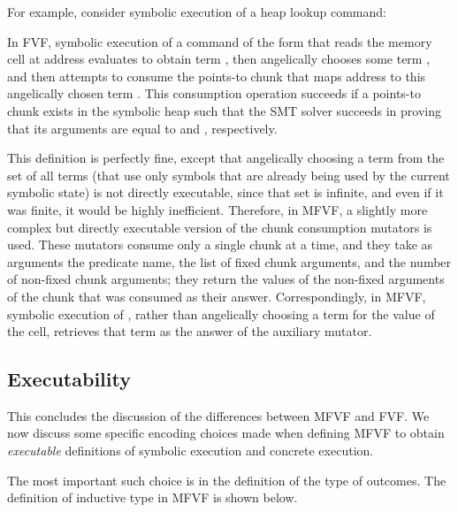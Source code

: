 \documentclass{CSML}
\newenvironment{changemargin}[2]{}{}
\newenvironment{beamerframe}[1]{}{}
\theoremstyle{definition}\newtheorem{notation}[thm]{Notation}
\theoremstyle{plain}\newtheorem{satz}[thm]{Satz}
\begin{document}
For example, consider symbolic execution of a heap lookup command:
\medskip

\noindent In FVF, symbolic execution of a command of the form  that reads the memory cell at address  evaluates  to obtain 
term , then angelically chooses some term , and then attempts 
to consume the points-to chunk that maps address  to this 
angelically chosen term . This consumption operation succeeds if a 
points-to chunk exists in the symbolic heap such that the SMT solver 
succeeds in proving that its arguments are equal to  and , 
respectively.

This definition is perfectly fine, except that angelically choosing a term 
from the set of all terms (that use only symbols that are already being 
used by the current symbolic state) is not directly executable, since that 
set is infinite, and even if it was finite, it would be highly 
inefficient. Therefore, in MFVF, a slightly more complex but directly 
executable version of the chunk consumption mutators is used. These 
mutators consume only a single chunk at a time, and they take as arguments 
the predicate name, the list of fixed chunk arguments, and the number of 
non-fixed chunk arguments; they return the values of the non-fixed 
arguments of the chunk that was consumed as their answer. Correspondingly, 
in MFVF, symbolic execution of , rather than angelically 
choosing a term for the value of the cell, retrieves that term as the 
answer of the  auxiliary mutator.

\subsection{Executability}

This concludes the discussion of the differences between MFVF and FVF. We 
now discuss some specific encoding choices made when defining MFVF to 
obtain \emph{executable} definitions of symbolic execution and concrete 
execution.

\newcommand{\coqindtype}[1]{\textbf{\textsf{\small #1}}}

The most important such choice is in the definition of the type of 
outcomes. The definition of inductive type  in 
MFVF is shown below.\vspace{-5 pt}
\begin{beamerframe}{Executability: Outcomes}

\begin{changemargin}{-1cm}{-1cm}

\end{changemargin}

\end{beamerframe}\medskip
\end{document}
